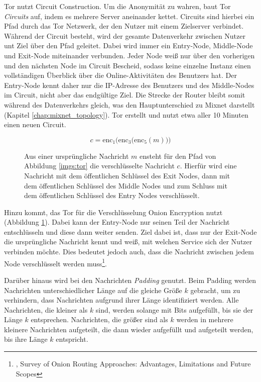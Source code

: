 Tor nutzt Circuit Construction. Um die Anonymität zu wahren, baut Tor \textit{Circuits} auf, indem es mehrere Server aneinander kettet. Circuits sind hierbei ein Pfad durch das Tor Netzwerk, der den Nutzer mit einem Zielserver verbindet. Während der Circuit besteht, wird der gesamte Datenverkehr zwischen Nutzer unt Ziel über den Pfad geleitet. Dabei wird immer ein Entry-Node, Middle-Node und Exit-Node miteinander verbunden. Jeder Node weiß nur über den vorherigen und den nächsten Node im Circuit Bescheid, sodass keine einzelne Instanz einen vollständigen Überblick über die Online-Aktivitäten des Benutzers hat. Der Entry-Node kennt daher nur die IP-Adresse des Benutzers und des Middle-Nodes im Circuit, nicht aber das endgültige Ziel. Die Strecke der Router bleibt somit während des Datenverkehrs gleich, was den Hauptunterschied zu Mixnet darstellt (Kapitel \ref{chap:mixnet_topology}). Tor erstellt und nutzt etwa aller 10 Minuten einen neuen Circuit.

\begin{figure}[!h]
    \begin{displaymath}
        c = \mathrm{enc}_{1}\Big(\mathrm{enc}_{3}\big(\mathrm{enc}_{5}(m)\big)\Big)
    \end{displaymath}
    \caption{Aus einer ursprüngliche Nachricht $m$ ensteht für den Pfad von Abbildung \ref{imgs:tor} die verschlüsselte Nachricht $c$. Hierfür wird eine Nachricht mit dem öffentlichen Schlüssel des Exit Nodes, dann mit dem öffentlichen Schlüssel des Middle Nodes und zum Schluss mit dem öffentlichen Schlüssel des Entry Nodes verschlüsselt.}
    \label{equa:encryption}
\end{figure}

Hinzu kommt, das Tor für die Verschlüsselung Onion Encryption nutzt (Abbildung \ref{equa:encryption}). Dabei kann der Entry-Node nur seinen Teil der Nachricht entschlüsseln und diese dann weiter senden. Ziel dabei ist, dass nur der Exit-Node die ursprüngliche Nachricht kennt und weiß, mit welchen Service sich der Nutzer verbinden möchte. Dies bedeutet jedoch auch, dass die Nachricht zwischen jedem Node verschlüsselt werden muss\footnote{\cite{OnionRoutingApproaches}, Survey of Onion Routing Approaches: Advantages, Limitations and Future Scopes}.

Darüber hinaus wird bei den Nachrichten \textit{Padding} genutzt. Beim Padding werden Nachrichten unterschiedlicher Länge auf die gleiche Größe $k$ gebracht, um zu verhindern, dass Nachrichten aufgrund ihrer Länge identifiziert werden. Alle Nachrichten, die kleiner als $k$ sind, werden solange mit Bits aufgefüllt, bis sie der Länge $k$ entsprechen. Nachrichten, die größer sind als $k$ werden in mehrere kleinere Nachrichten aufgeteilt, die dann wieder aufgefüllt und aufgeteilt werden, bis ihre Länge $k$ entspricht\cite{TorPadding}.

